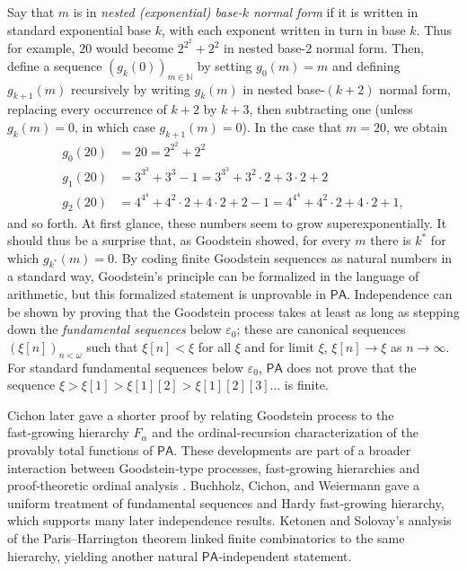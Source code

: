 \documentclass{amsart}
\theoremstyle{plain}
\theoremstyle{plain}
\newcommand{\PA}{\mathsf{PA}}
\newcommand{\al}{{\alpha}}
\begin{document}
Say that $m$ is in {\em nested (exponential) base-$k$ normal form} if it is written in standard exponential base $k$, with each exponent written in turn in base $k$.
Thus for example, $20 $ would become $2^{2^2}+2^2$ in nested base-$2$ normal form.
Then, define a sequence $(g_k(0))_{m\in\mathbb N}$ by setting $g_0(m) = m$ and defining $g_{k+1}(m)$ recursively by writing $ g_k(m)$ in nested base-$(k+2)$ normal form, replacing every occurrence of $k+2$ by $k+3$, then subtracting one (unless $g_k(m)=0$, in which case $g_{k+1}(m) =0$).
In the case that $m=20$, we obtain
\begin{align*}
g_0(20) & =20 = 2^{2^2}+2^2\\
g_1(20) &  = 3^{3^3}+3^3 -1 = 3^{3^3}+3^2\cdot 2 + 3\cdot 2 + 2\\
g_2(20) & = 4^{4^4}+4^2\cdot 2 + 4\cdot 2 +2 -1 = 4^{4^4}+4^2\cdot 2 + 4\cdot 2 +1,
\end{align*} 
and so forth.
At first glance, these numbers seem to grow superexponentially.
It should thus be a surprise that, as Goodstein showed, for every $m$ there is $k^*$ for which $g_{k^*}(m)=0$. 
By coding finite Goodstein sequences as natural numbers in a standard way, Goodstei{n'}s principle can be formalized in the language of arithmetic, but this formalized statement is unprovable in $\PA$. Independence can be shown by proving that the Goodstein process takes at least as long as stepping down the {\em fundamental sequences} below $\varepsilon_0$; these are canonical sequences $( \xi [n])_{n<\omega}$ such that $ \xi [n]< \xi$ for all $\xi$ and for limit $\xi$, $ \xi [n] \to \xi$ as $n\to \infty$.
For standard fundamental sequences below $\varepsilon_0$, $\PA$ does not prove that the sequence $\xi >  \xi [1] > \xi[1][2] > \xi[1][2][3] \ldots $ is finite. 
\smallskip

Cichon later gave a shorter proof by relating Goodstein process to the fast‑growing hierarchy $F_\al$ and the ordinal‑recursion characterization of the provably total functions of $\PA$.\cite{Cichon1983}
These developments are part of a broader interaction between Goodstein‑type processes, fast‑growing hierarchies and proof‑theoretic ordinal analysis \cite{Buchholz.Wainer1987, Weiermann95, Cichon.Wainer1983}.
Buchholz, Cichon, and Weiermann \cite{BuchholzCW1994} gave a uniform treatment of fundamental sequences and Hardy fast‑growing hierarchy, which supports many later independence results. 
Ketonen and Solovay’s analysis of the Paris–Harrington theorem linked finite combinatorics to the same hierarchy, yielding another natural
$\PA$‑independent statement. \cite{ketonen1981rapidly}
\end{document}
